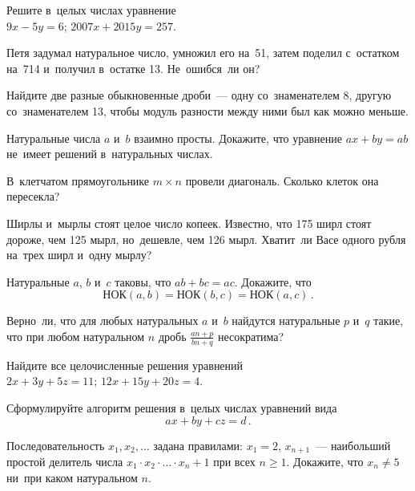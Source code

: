 \begin{problems}

\item
Решите в~целых числах уравнение
\\
\subproblem $9 x - 5 y = 6$;
\quad
\subproblem $2007 x + 2015 y = 257$.

\item
Петя задумал натуральное число, умножил его на~51, затем поделил с~остатком
на~714 и~получил в~остатке 13.
Не~ошибся~ли он?

\item
Найдите две разные обыкновенные дроби~--- одну со~знаменателем 8, другую
со~знаменателем 13, чтобы модуль разности между ними был как можно меньше.

\item
Натуральные числа $a$ и~$b$ взаимно просты.
Докажите, что уравнение $a x + b y = a b$ не~имеет решений в~натуральных
числах.

\item
В~клетчатом прямоугольнике $m \times n$ провели диагональ.
Сколько клеток она пересекла?

\item
Ширлы и~мырлы стоят целое число копеек.
Известно, что 175 ширл стоят дороже, чем 125 мырл, но~дешевле, чем 126 мырл.
Хватит~ли Васе одного рубля на~трех ширл и~одну мырлу?

\item
Натуральные $a$, $b$ и~$c$ таковы, что $a b + b c = a c$.
Докажите, что
\[
    \text{НОК}(a, b) = \text{НОК}(b, c) = \text{НОК}(a, c)
\,.\]

\item
Верно~ли, что для любых натуральных $a$ и~$b$ найдутся натуральные $p$ и~$q$
такие, что при любом натуральном $n$ дробь $\frac{a n + p}{b n + q}$
несократима?

\item
Найдите все целочисленные решения уравнений
\\
\subproblem
$2 x + 3 y + 5 z = 11$;
\quad
\subproblem
$12 x + 15 y + 20 z = 4$.

\item
Сформулируйте алгоритм решения в~целых числах уравнений вида
\[
    a x + b y + c z = d
\,.\]

\item
Последовательность $x_1, x_2, \ldots$ задана правилами:
$x_1 = 2$, $x_{n+1}$~--- наибольший простой делитель числа
$x_1 \cdot x_2 \cdot \ldots \cdot x_n + 1$ при всех $n \geq 1$.
Докажите, что $x_n \neq 5$ ни~при каком натуральном $n$. 


\end{problems}

